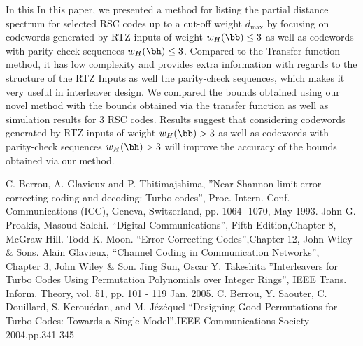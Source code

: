 \documentclass[11pt, oneside, dvipdfmx]{book}
\begin{document}
In this In this paper, we presented a method for listing the partial distance spectrum for selected RSC codes up to a cut-off weight $d_{\text{max}}$ by focusing on codewords generated by RTZ inputs of weight $w_H(\bb) \leq 3$ as well as codewords with parity-check sequences $w_H(\bh) \leq 3$. Compared to the Transfer function method, it has low complexity and provides extra information with regards to the structure of the RTZ Inputs as well the parity-check sequences, which makes it very useful in interleaver design. We compared the bounds obtained using our novel method with the bounds obtained via the transfer function as well as simulation results for 3 RSC codes. Results suggest that considering codewords generated by RTZ inputs of weight $w_H(\bb) > 3$ as well as codewords with parity-check sequences $w_H(\bh) > 3$  will improve the accuracy of the bounds obtained via our method.

\begin{thebibliography}{99}
  C. Berrou, A. Glavieux and P. Thitimajshima, 
''Near Shannon limit error-correcting coding and
decoding: Turbo codes'', Proc. Intern. Conf. Communications (ICC), Geneva, 
Switzerland, pp. 1064-
1070, May 1993.
 John G. Proakis, Masoud Salehi. ``Digital Communications'', 
Fifth Edition,Chapter 8, McGraw-Hill.
 Todd K. Moon. ``Error Correcting Codes'',Chapter 12, John Wiley \& Sons.
Alain Glavieux, ``Channel Coding in Communication Networks'',\\ Chapter 3, John Wiley \& Son. 
 Jing Sun, Oscar Y. Takeshita ''Interleavers for Turbo Codes Using 
Permutation Polynomials over Integer Rings'', IEEE Trans. Inform. Theory, vol. 51, 
pp. 101 - 119  Jan. 2005.
 C. Berrou, Y. Saouter, C. Douillard, S. Kerouédan, and M. Jézéquel ``Designing Good Permutations for Turbo Codes: Towards a Single Model'',IEEE Communications Society 2004,pp.341-345

\end{thebibliography}
%
%
%
%
%
%


\end{document}
